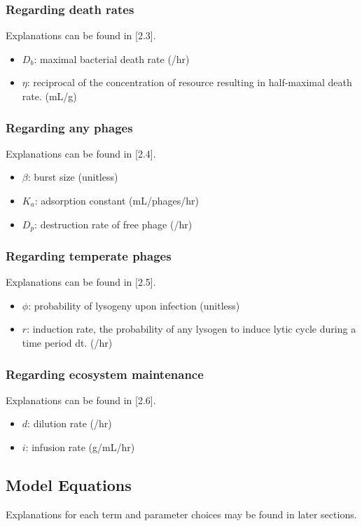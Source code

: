 \documentclass{article}
\begin{document}
\subsubsection{Regarding death rates} 
Explanations can be found in [2.3].
\begin{itemize}
\item $D_b$: maximal bacterial death rate (/hr)

\item $\eta$: reciprocal of the concentration of resource resulting in half-maximal death rate. (mL/g)
\end{itemize}

\subsubsection{Regarding any phages} 
Explanations can be found in [2.4].
\begin{itemize}
\item $\beta$: burst size (unitless)
\item $K_a$: adsorption constant (mL/phages/hr)
\item $D_p$: destruction rate of free phage (/hr)
\end{itemize}

\subsubsection{Regarding temperate phages} 
Explanations can be found in [2.5].

\begin{itemize}
\item $\phi$: probability of lysogeny upon infection (unitless)

\item $r$: induction rate, the probability of any lysogen to induce lytic cycle during a time period dt. (/hr)
\end{itemize}
\subsubsection{Regarding ecosystem maintenance} 
Explanations can be found in [2.6].
\begin{itemize}
\item $d$: dilution rate (/hr)

\item $i$: infusion rate (g/mL/hr)
\end{itemize}


\subsection{Model Equations}
Explanations for each term and parameter choices may be found in later sections. 
\end{document}

